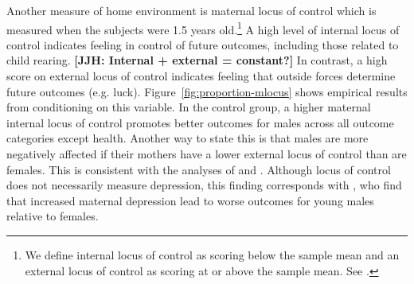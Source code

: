 Another measure of home environment is maternal locus of control which is measured when the subjects were 1.5 years old.\footnote{We define internal locus of control as scoring below the sample mean and an external locus of control as scoring at or above the sample mean. See \citet{Rotter_1966_PMGaA}.} A high level of internal locus of control indicates feeling in control of future outcomes, including those related to child rearing. \textbf{[JJH: Internal + external = constant?]} In contrast, a high score on external locus of control indicates feeling that outside forces determine future outcomes (e.g. luck). Figure~\ref{fig:proportion-mlocus} shows empirical results from conditioning on this variable. In the control group, a higher maternal internal locus of control promotes better outcomes for males across all outcome categories except health. Another way to state this is that males are more negatively affected if their mothers have a lower external locus of control than are females. This is consistent with the analyses of \citet{Schore_2017_IMHJ} and \citet{golding2016psychology}. Although locus of control does not necessarily measure depression, this finding corresponds with \citet{Beeghly-etal_2017_IMHJ}, who find that increased maternal depression lead to worse outcomes for young males relative to females.

